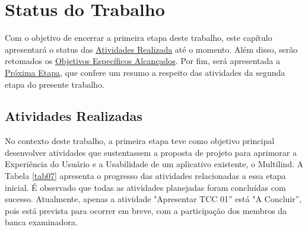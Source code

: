\chapter[Status do Trabalho]{Status do Trabalho}
\label{chap:Status}
Com o objetivo de encerrar a primeira etapa deste trabalho, este capítulo apresentará o status das \hyperref[sec:Atividades Realizadas]{Atividades
Realizada} até o momento. Além disso, serão retomados os \hyperref[sec:Objetivos Especificos Alcancados]{Objetivos Específicos Alcançados}. 
Por fim, será apresentada a \hyperref[sec:Proxima Etapa]{Próxima Etapa}, que confere um resumo a respeito das atividades da segunda etapa do presente trabalho.

\section{Atividades Realizadas}
\label{sec:Atividades Realizadas}
No contexto deste trabalho, a primeira etapa teve como objetivo principal desenvolver atividades que sustentassem a proposta 
de projeto para aprimorar a Experiência do Usuário e a Usabilidade de um aplicativo existente, o Multilind. A Tabela \ref{tab07} apresenta 
o progresso das atividades relacionadas a essa etapa inicial. É observado que todas as atividades planejadas foram concluídas com sucesso. 
Atualmente, apenas a atividade "Apresentar TCC 01'' está "A Concluir'', pois está prevista para ocorrer em breve, com a participação dos membros da banca 
examinadora.

